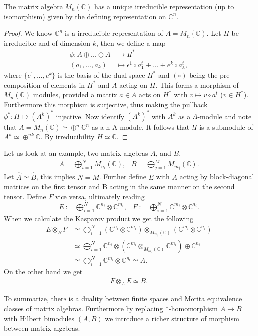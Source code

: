 \begin{mylemma}
    The matrix algebra $M_n(\mathbb{C})$ has a unique irreducible
    representation (up to isomorphism) given by the defining representation on
    $\mathbb{C}^n$.
\end{mylemma}
\begin{proof}
    We know $\mathbb{C}^n$ is a irreducible representation of $A=
    M_n(\mathbb{C})$. Let $H$ be irreducible and of dimension $k$, then we
    define a map
    \begin{align}
        \phi : A\oplus...\oplus A &\rightarrow H^* \\
    (a_1,...,a_k)&\mapsto e^1\circ a_1^t+...+e^k\circ a_k^t,
    \end{align}
where $\{e^1,...,e^k\}$ is the basis of the dual space $H^*$ and
$(\circ)$ being the pre-composition of elements in $H^*$ and $A$ acting on $H$.
This forms a morphism of $M_n(\mathbb{C})$ modules, provided a matrix $a \in A$
acts on $H^*$ with $v\mapsto v\circ a^t$ ($v\in H^*$).  Furthermore this
morphism is surjective, thus making the pullback $\phi ^*:H\mapsto (A^k)^*$
injective.  Now identify $(A^k)^*$ with $A^k$ as a $A$-module and note that
$A=M_n(\mathbb{C}) \simeq \oplus ^n \mathbb{C}^n$ as a n A module.  It follows
that $H$ is a submodule of $A^k \simeq \oplus ^{nk}\mathbb{C}$. By
irreducibility $H \simeq \mathbb{C}$.
\end{proof}

Let us look at an example, two matrix algebras $A$, and $B$.
\begin{align}
    A = \bigoplus ^N_{i=1} M_{n_i}(\mathbb{C}), \;\;\;
    B = \bigoplus ^M_{j=1} M_{m_j}(\mathbb{C}).
\end{align}
Let $\hat{A} \simeq \hat{B}$, this implies $N=M$. Further define $E$ with $A$
acting by block-diagonal matrices on the first tensor and B acting in the same
manner on the second tensor. Define $F$ vice versa, ultimately reading
\begin{align}
    E:= \bigoplus _{i=1}^N \mathbb{C}^{n_i} \otimes \mathbb{C}^{m_i}, \;\;\;
    F:= \bigoplus _{i=1}^N \mathbb{C}^{m_i} \otimes \mathbb{C}^{n_i}.
\end{align}
When we calculate the Kasparov product we get the following
\begin{align}
    E \otimes _B F &\simeq \bigoplus _{i=1}^N (\mathbb{C}^{n_i}\otimes\mathbb{C}^{m_i})
        \otimes _{M_{m_i}(\mathbb{C})} (\mathbb{C}^{m_i}\otimes\mathbb{C}^{n_i}) \\
                   &\simeq \bigoplus _{i=1}^N \mathbb{C}^{n_i}\otimes
                   \left(\mathbb{C}^{m_i}\otimes _{M_{m_i}(\mathbb{C})}\mathbb{C}^{m_i}\right)
                    \oplus \mathbb{C}^{n_i} \\
                   &\simeq \bigoplus _{i=1}^N
                   \mathbb{C}^{m_i}\otimes\mathbb{C}^{n_i} \simeq A.
\end{align}
On the other hand we get
\begin{align}
    F \otimes _A E \simeq B.
\end{align}

To summarize, there is a duality between finite spaces and Morita equivalence
classes of matrix algebras. Furthermore by replacing $*$-homomorphism $A\rightarrow B$
with Hilbert bimodules $(A,B)$ we introduce a richer structure of morphism
between matrix algebras.
